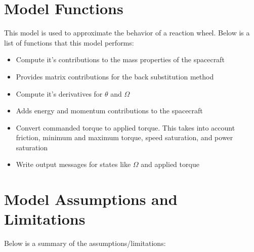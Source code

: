 \section{Model Functions}

This model is used to approximate the behavior of a reaction wheel. Below is a list of functions that this model performs:

\begin{itemize}
	\item Compute it's contributions to the mass properties of the spacecraft
	\item Provides matrix contributions for the back substitution method
	\item Compute it's derivatives for $\theta$ and $\Omega$
	\item Adds energy and momentum contributions to the spacecraft
	\item Convert commanded torque to applied torque. This takes into account friction, minimum and maximum torque, speed saturation, and power saturation
	\item Write output messages for states like $\Omega$ and applied torque
\end{itemize}

\section{Model Assumptions and Limitations}
Below is a summary of the assumptions/limitations:

